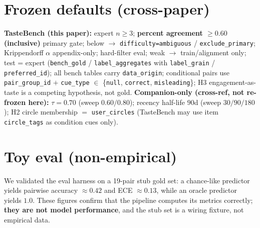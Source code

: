 \documentclass[11pt,a4paper]{article}
\begin{document}

\appendix

\section{Frozen defaults (cross-paper)}
\label{app:defaults}

\textbf{TasteBench (this paper):} expert $n \ge 3$; \textbf{percent agreement $\ge 0.60$ (inclusive)} primary gate; below $\rightarrow$ \texttt{difficulty=ambiguous} / \texttt{exclude\_primary}; Krippendorff $\alpha$ appendix-only; hard-filter eval; weak $\rightarrow$ train/alignment only; test = expert (\texttt{bench\_gold} / \texttt{label\_aggregates} with \texttt{label\_grain} / \texttt{preferred\_id}); all bench tables carry \texttt{data\_origin}; conditional pairs use \texttt{pair\_group\_id} $+$ \texttt{cue\_type} $\in$ \{\texttt{null}, \texttt{correct}, \texttt{misleading}\}; H3 engagement-as-taste is a competing hypothesis, not gold. \textbf{Companion-only (cross-ref, not re-frozen here):} $\tau=0.70$ (sweep $0.60/0.80$); recency half-life $90$d (sweep $30/90/180$); H2 circle membership $=$ \texttt{user\_circles} (TasteBench may use item \texttt{circle\_tags} as condition cues only).

\section{Toy eval (non-empirical)}
\label{app:toy}

We validated the eval harness on a 19-pair stub gold set: a chance-like predictor yields pairwise accuracy $\approx 0.42$ and ECE $\approx 0.13$, while an oracle predictor yields $1.0$. These figures confirm that the pipeline computes its metrics correctly; \textbf{they are not model performance}, and the stub set is a wiring fixture, not empirical data.



\end{document}
